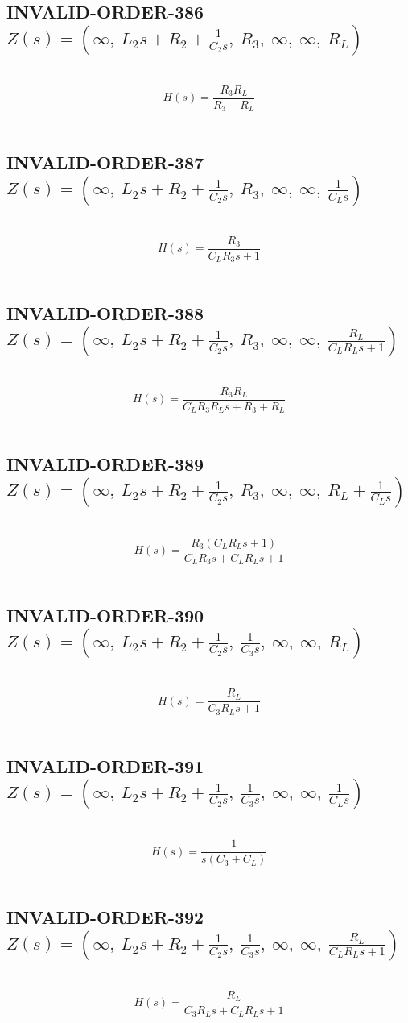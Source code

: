 \documentclass{article}
\begin{document}
\subsection{INVALID-ORDER-386 $Z(s) = \left( \infty, \  L_{2} s + R_{2} + \frac{1}{C_{2} s}, \  R_{3}, \  \infty, \  \infty, \  R_{L}\right)$ } \ 
\textbf{\[H(s) = \frac{R_{3} R_{L}}{R_{3} + R_{L}}\] } \ 
\subsection{INVALID-ORDER-387 $Z(s) = \left( \infty, \  L_{2} s + R_{2} + \frac{1}{C_{2} s}, \  R_{3}, \  \infty, \  \infty, \  \frac{1}{C_{L} s}\right)$ } \ 
\textbf{\[H(s) = \frac{R_{3}}{C_{L} R_{3} s + 1}\] } \ 
\subsection{INVALID-ORDER-388 $Z(s) = \left( \infty, \  L_{2} s + R_{2} + \frac{1}{C_{2} s}, \  R_{3}, \  \infty, \  \infty, \  \frac{R_{L}}{C_{L} R_{L} s + 1}\right)$ } \ 
\textbf{\[H(s) = \frac{R_{3} R_{L}}{C_{L} R_{3} R_{L} s + R_{3} + R_{L}}\] } \ 
\subsection{INVALID-ORDER-389 $Z(s) = \left( \infty, \  L_{2} s + R_{2} + \frac{1}{C_{2} s}, \  R_{3}, \  \infty, \  \infty, \  R_{L} + \frac{1}{C_{L} s}\right)$ } \ 
\textbf{\[H(s) = \frac{R_{3} \left(C_{L} R_{L} s + 1\right)}{C_{L} R_{3} s + C_{L} R_{L} s + 1}\] } \ 
\subsection{INVALID-ORDER-390 $Z(s) = \left( \infty, \  L_{2} s + R_{2} + \frac{1}{C_{2} s}, \  \frac{1}{C_{3} s}, \  \infty, \  \infty, \  R_{L}\right)$ } \ 
\textbf{\[H(s) = \frac{R_{L}}{C_{3} R_{L} s + 1}\] } \ 
\subsection{INVALID-ORDER-391 $Z(s) = \left( \infty, \  L_{2} s + R_{2} + \frac{1}{C_{2} s}, \  \frac{1}{C_{3} s}, \  \infty, \  \infty, \  \frac{1}{C_{L} s}\right)$ } \ 
\textbf{\[H(s) = \frac{1}{s \left(C_{3} + C_{L}\right)}\] } \ 
\subsection{INVALID-ORDER-392 $Z(s) = \left( \infty, \  L_{2} s + R_{2} + \frac{1}{C_{2} s}, \  \frac{1}{C_{3} s}, \  \infty, \  \infty, \  \frac{R_{L}}{C_{L} R_{L} s + 1}\right)$ } \ 
\textbf{\[H(s) = \frac{R_{L}}{C_{3} R_{L} s + C_{L} R_{L} s + 1}\] } \ 
\end{document}

